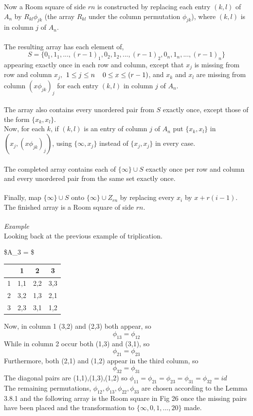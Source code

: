 \documentclass[
  12pt,
  a4paper]{book}
\begin{document}
Now a Room square of side \(rn\) is constructed by replacing each entry
\((k,l)\) of \(A_n\) by \(R_{kl} \phi _{jk}\) (the array \(R_{kl}\) under the
column permutation \(\phi _{jk}\)), where \((k,l)\) is in column \(j\) of
\(A_n\).\\
~\\
The resulting array has each element of,
\[S = \{0_1,1_1,...,(r-1)_1,0_2,1_2,...,(r-1)_2,0_n,1_n,...,(r-1)_n\}\]
appearing exactly once in each row and column, except that \(x_j\) is
missing from row and column \(x_j,\)
\(1 \leq j \leq n \hspace{0.4cm} 0 \leq x \leq (r-1)\), and \(x_k\) and
\(x_l\) are missing from column \((x \phi _{jk})_j\) for each entry \((k,l)\)
in column \(j\) of \(A_n\).\\
~\\
The array also contains every unordered pair from \(S\) exactly once,
except those of the form \(\{x_k,x_l\}\).\\
Now, for each \(k\), if \((k,l)\) is an entry of column \(j\) of \(A_n\) put
\(\{x_k,x_l\}\) in \((x_j,(x \phi _{jk})_j)\), using \(\{\infty, x_j\}\)
instead of \(\{x_j,x_j\}\) in every case.\\
~\\
The completed array contains each of \(\{\infty\} \cup S\) exactly once
per row and column and every unordered pair from the same set exactly
once.\\
~\\
Finally, map \(\{\infty\} \cup S\) onto \(\{\infty \} \cup Z_{rn}\) by
replacing every \(x_i\) by \(x+r(i-1)\). The finished array is a Room square
of side \(rn\).\\
~\\
\emph{Example}\\
Looking back at the previous example of triplication.

\$A\_3 = \$

\begin{longtable}[]{@{}lccc@{}}
\toprule
& 1 & 2 & 3\tabularnewline
\midrule
\endhead
1 & 1,1 & 2,2 & 3,3\tabularnewline
2 & 3,2 & 1,3 & 2,1\tabularnewline
3 & 2,3 & 3,1 & 1,2\tabularnewline
\bottomrule
\end{longtable}

Now, in column 1 (3,2) and (2,3) both appear, so
\[\phi _{13} = \phi _{12}\] While in column 2 occur both (1,3) and
(3,1), so \[\phi _{21} = \phi _{23}\] Furthermore, both (2,1) and (1,2)
appear in the third column, so \[\phi _{32} = \phi _{31}\] The diagonal
pairs are (1,1),(1,3),(1,2) so
\(\phi _{11}=\phi _{21}=\phi _{23}=\phi _{31}=\phi _{32}=id\)\\
The remaining permutations,
\(\phi _{12},\phi _{13},\phi _{22},\phi _{33}\) are chosen according to
the Lemma 3.8.1 and the following array is the Room square in Fig 26
once the missing pairs have been placed and the transformation to
\(\{\infty, 0, 1, ..., 20\}\) made.
\end{document}
